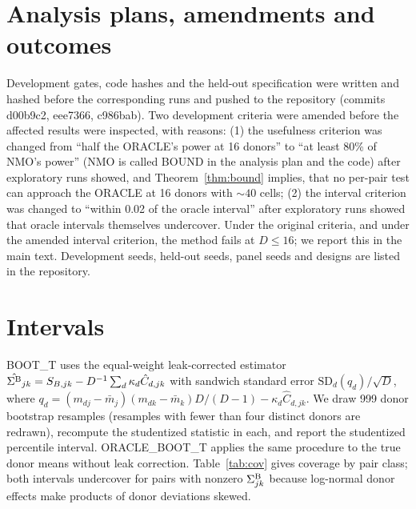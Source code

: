 \section{Analysis plans, amendments and outcomes}\label{app:prereg}
Development gates, code hashes and the held-out specification were written and hashed before the corresponding runs and pushed to the repository (commits d00b9c2, eee7366, c986bab). Two development criteria were amended before the affected results were inspected, with reasons: (1) the usefulness criterion was changed from ``half the ORACLE's power at 16 donors'' to ``at least 80\% of NMO's power'' (NMO is called BOUND in the analysis plan and the code) after exploratory runs showed, and Theorem~\ref{thm:bound} implies, that no per-pair test can approach the ORACLE at 16 donors with ${\sim}40$ cells; (2) the interval criterion was changed to ``within 0.02 of the oracle interval'' after exploratory runs showed that oracle intervals themselves undercover. Under the original criteria, and under the amended interval criterion, the method fails at $D\le16$; we report this in the main text. Development seeds, held-out seeds, panel seeds and designs are listed in the repository.

\section{Intervals}\label{app:ci}
BOOT\_T uses the equal-weight leak-corrected estimator $\hat{\Sigma^{\mathrm{B}}}_{jk}=S_{B,jk}-D^{-1}\sum_d\kappa_d\hat C_{d,jk}$ with sandwich standard error $\mathrm{SD}_d(q_d)/\sqrt D$, where $q_d=(m_{dj}-\bar m_j)(m_{dk}-\bar m_k)D/(D-1)-\kappa_d\hat C_{d,jk}$. We draw 999 donor bootstrap resamples (resamples with fewer than four distinct donors are redrawn), recompute the studentized statistic in each, and report the studentized percentile interval. ORACLE\_BOOT\_T applies the same procedure to the true donor means without leak correction. Table~\ref{tab:cov} gives coverage by pair class; both intervals undercover for pairs with nonzero $\Sigma^{\mathrm{B}}_{jk}$ because log-normal donor effects make products of donor deviations skewed.


